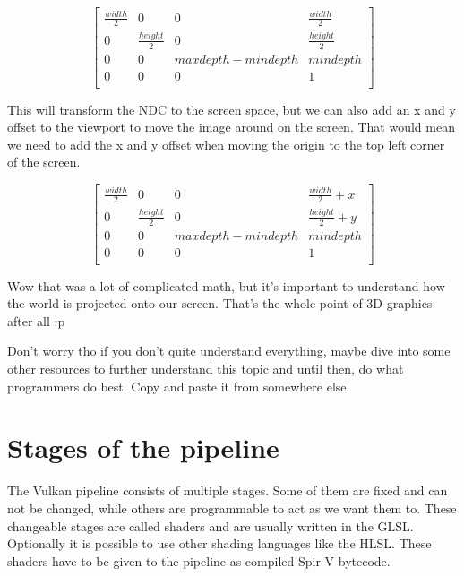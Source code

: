 \documentclass[12pt]{report} \usepackage{preamble}
\begin{document}
\[
	\begin{bmatrix}
		\frac{width}{2} & 0                & 0                   & \frac{width}{2}  \\
		0               & \frac{height}{2} & 0                   & \frac{height}{2} \\
		0               & 0                & maxdepth - mindepth & mindepth         \\
		0               & 0                & 0                   & 1                \\
	\end{bmatrix}
\]

This will transform the \ac{NDC} to the screen space, but we can also add an x
and y offset to the viewport to move the image around on the screen.
That would mean we need to add the x and y offset when moving
the origin to the top left corner of the screen.

\[
	\begin{bmatrix}
		\frac{width}{2} & 0                & 0                   & \frac{width}{2} + x  \\
		0               & \frac{height}{2} & 0                   & \frac{height}{2} + y \\
		0               & 0                & maxdepth - mindepth & mindepth             \\
		0               & 0                & 0                   & 1                    \\
	\end{bmatrix}
\]

Wow that was a lot of complicated math, but it's important to understand how the world is
projected onto our screen. That's the whole point of 3D graphics after all :p

Don't worry tho if you don't quite understand everything, maybe dive into some other resources to further
understand this topic and until then, do what programmers do best. Copy and paste it from somewhere else.

\section{Stages of the pipeline}

The Vulkan pipeline consists of multiple stages. Some of them are fixed
and can not be changed, while others are programmable to act as we
want them to. These changeable stages are called shaders and are usually
written in the \ac{GLSL}. Optionally it is possible
to use other shading languages like the \ac{HLSL}.
These shaders have to be given to the pipeline as compiled \ac{Spir-V} bytecode. \cite{spirv}
\end{document}

